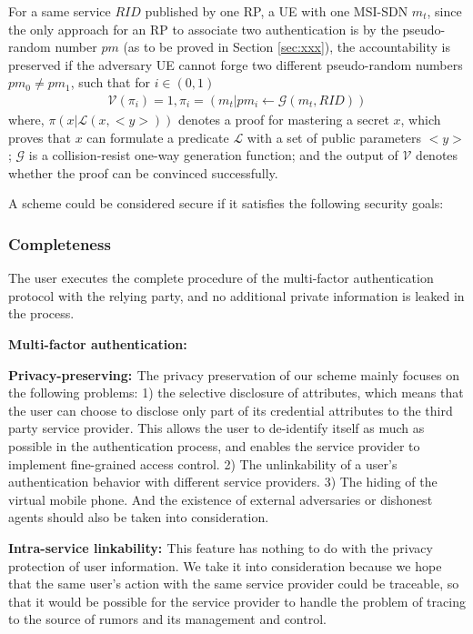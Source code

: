 \begin{definition}
	For a same service $RID$ published by one RP, a UE with one MSI-SDN $m_t$, since the only approach for an RP to associate two authentication is by the pseudo-random number $pm$ (as to be proved in Section \ref{sec:xxx}), the accountability is preserved if the adversary UE cannot forge two different pseudo-random numbers $pm_0\neq pm_1$, such that for $i\in (0,1)$
	\begin{align}
	\mathcal{V}(\pi_i) = 1, \pi_i = (m_t|pm_i\gets\mathcal{G}(m_t, RID))
	\end{align}
	where, $\pi(x|\mathcal{L}(x, <y>))$ denotes a proof for mastering a secret $x$, which proves that $x$ can formulate a predicate $\mathcal{L}$ with a set of public parameters $<y>$; $\mathcal{G}$ is a collision-resist one-way generation function; and the output of $\mathcal{V}$ denotes whether the proof can be convinced successfully.
\end{definition}

A scheme could be considered secure if it satisfies the following security goals:
\subsubsection{Completeness}
The user executes the complete procedure of the multi-factor authentication protocol with the relying party, and no additional private information is leaked in the process.
\begin{list}{}{}
    \item{\bf{Multi-factor authentication: }}
    \item{\bf{Privacy-preserving: }}The privacy preservation of our scheme mainly focuses on the following problems: 1) the selective disclosure of attributes, which means that the user can choose to disclose only part of its credential attributes to the third party service provider. This allows the user to de-identify itself as much as possible in the authentication process, and enables the service provider to implement fine-grained access control. 2) The unlinkability of a user's authentication behavior with different service providers. 3) The hiding of the virtual mobile phone. And the existence of external adversaries or dishonest agents should also be taken into consideration.\\
    \item{\bf{Intra-service linkability: }}This feature has nothing to do with the privacy protection of user information. We take it into consideration because we hope that the same user's action with the same service provider could be traceable, so that it would be possible for the service provider to handle the problem of tracing to the source of rumors and its management and control.\\
\end{list}
